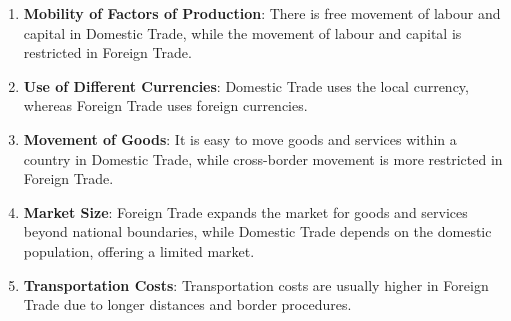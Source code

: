 \documentclass[12pt,a4paper, openany]{book}
\begin{document}
\begin{enumerate}
	\item \textbf{Mobility of Factors of Production}:
	      There is free movement of labour and capital in Domestic Trade, while the movement of labour and capital is restricted in Foreign Trade.
	\item \textbf{Use of Different Currencies}:
	      Domestic Trade uses the local currency, whereas Foreign Trade uses foreign currencies.
	\item \textbf{Movement of Goods}:
	      It is easy to move goods and services within a country in Domestic Trade, while cross-border movement is more restricted in Foreign Trade.
	\item \textbf{Market Size}:
	      Foreign Trade expands the market for goods and services beyond national boundaries, while Domestic Trade depends on the domestic population, offering a limited market.
	\item \textbf{Transportation Costs}:
	      Transportation costs are usually higher in Foreign Trade due to longer distances and border procedures.
\end{enumerate}



\backmatter

\nocite{*}
\printbibliography{}
\end{document}
